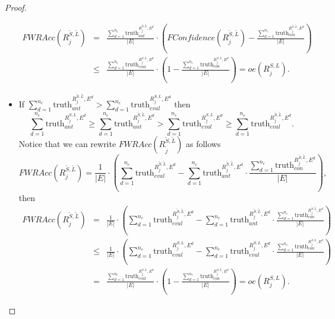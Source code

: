 \begin{proof}
\begin{itemize}
	\begin{eqnarray*}
		FWRAcc(R^{\tilde{S},\tilde{L}}_{j}) &=& \frac{\displaystyle \sum_{d=1}^{n_e}\text{truth}_{ant}^{R^{\tilde{S},\tilde{L}}_{j},E^d}}{|E|} \cdot \left(FConfidence(R^{\tilde{S},\tilde{L}}_{j}) - \frac{\displaystyle \sum_{d=1}^{n_e}\text{truth}_{con}^{R^{\tilde{S},\tilde{L}}_j,E^d}}{|E|}\right) \\
		& \leq &  \frac{\displaystyle \sum_{d=1}^{n_e} \text{truth}_{eval}^{R^{S,L}_j,E^d}}{|E|} \cdot \left(1 - \frac{\displaystyle \sum_{d=1}^{n_e}\text{truth}_{con}^{R^{S,L}_j,E^d}}{|E|}\right)=oe(R^{S,L}_j).
	\end{eqnarray*}
	\item If $\displaystyle \sum_{d=1}^{n_e}\text{truth}_{ant}^{R^{\tilde{S},\tilde{L}}_{j},E^d} > \sum_{d=1}^{n_e} \text{truth}_{eval}^{R^{S,L}_j,E^d}$ then
	$$\displaystyle \sum_{d=1}^{n_e}\text{truth}_{ant}^{R^{S,L}_j,E^d} \geq \displaystyle \sum_{d=1}^{n_e}\text{truth}_{ant}^{R^{\tilde{S},\tilde{L}}_j,E^d} > \sum_{d=1}^{n_e} \text{truth}_{eval}^{R^{S,L}_j,E^d} \geq  \sum_{d=1}^{n_e} \text{truth}_{eval}^{R^{\tilde{S},\tilde{L}}_{j},E^d}.$$
	 Notice that we can rewrite $FWRAcc(R^{\tilde{S},\tilde{L}}_{\tilde{j}})$ as follows 
	$$
	FWRAcc(R^{\tilde{S},\tilde{L}}_{j}) = \frac{1}{|E|} \cdot \left(\sum_{d=1}^{n_e} \text{truth}_{eval}^{R^{\tilde{S},\tilde{L}}_{j},E^d} - \sum_{d=1}^{n_e} \text{truth}_{ant}^{R^{\tilde{S},\tilde{L}}_{j},E^d} \cdot  \frac{\displaystyle \sum_{d=1}^{n_e}\text{truth}_{con}^{R^{\tilde{S},\tilde{L}}_j,E^d}}{|E|}\right),
	$$
	then
	\begin{eqnarray*}
			FWRAcc(R^{\tilde{S},\tilde{L}}_{j}) & = & \frac{1}{|E|} \cdot \left(\sum_{d=1}^{n_e} \text{truth}_{eval}^{R^{\tilde{S},\tilde{L}}_{j},E^d} - \sum_{d=1}^{n_e} \text{truth}_{ant}^{R^{\tilde{S},\tilde{L}}_{j},E^d} \cdot  \frac{\displaystyle \sum_{d=1}^{n_e}\text{truth}_{con}^{R^{\tilde{S},\tilde{L}}_j,E^d}}{|E|}\right) \\
			& \leq &   \frac{1}{|E|} \cdot \left(\sum_{d=1}^{n_e} \text{truth}_{eval}^{R^{S,L}_j,E^d} - \sum_{d=1}^{n_e} \text{truth}_{eval}^{R^{S,L}_j,E^d} \cdot  \frac{\displaystyle \sum_{d=1}^{n_e}\text{truth}_{con}^{R^{S,L}_j,E^d}}{|E|}\right) \\
			&=&   \frac{\displaystyle \sum_{d=1}^{n_e} \text{truth}_{eval}^{R^{S,L}_j,E^d}}{|E|} \cdot \left(1-\frac{\displaystyle \sum_{d=1}^{n_e}\text{truth}_{con}^{R^{S,L}_j,E^d}}{|E|}\right)=oe(R^{S,L}_j).
	\end{eqnarray*}
\end{itemize}
\end{proof}

